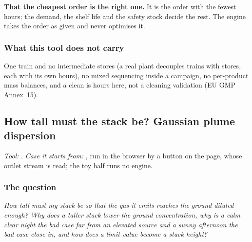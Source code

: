 \documentclass[11pt,a4paper]{article}
\begin{document}
\begin{pitfall}
\textbf{That the cheapest order is the right one.}  It is the order with the
fewest hours; the demand, the shelf life and the safety stock decide the rest.
The engine takes the order as given and never optimises it.
\end{pitfall}

\subsubsection*{What this tool does not carry}

One train and no intermediate stores (a real plant decouples trains with
stores, each with its own hours), no mixed sequencing inside a campaign, no
per-product mass balances, and a clean is hours here, not a cleaning
validation (EU GMP Annex~15).

\subsection{How tall must the stack be? Gaussian plume dispersion}\label{sec:edu-stack-dispersion}


\noindent\textit{\small Tool:} .  \textit{\small
Case it starts from:} , run in the
browser by a button on the page, whose outlet stream  is read;
the toy half runs no engine.

\subsubsection*{The question}

\emph{How tall must my stack be so that the gas it emits reaches the ground
diluted enough?  Why does a taller stack lower the ground concentration, why is
a calm clear night the bad case far from an elevated source and a sunny
afternoon the bad case close in, and how does a limit value become a stack
height?}
\end{document}
